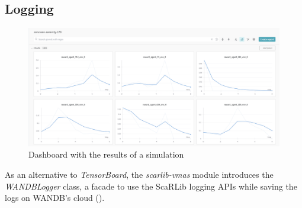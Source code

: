 \documentclass[12pt,a4paper,openright,twoside]{book}
\begin{document}
\subsection{Logging}

\begin{figure}[t]
    \centering
    \includegraphics[width=\textwidth]{img/wandb.png}
    \caption{Dashboard with the results of a simulation}
    \label{fig:wandb}
\end{figure}

As an alternative to \emph{TensorBoard}, the \emph{scarlib-vmas} module introduces the \emph{WANDBLogger} class, a facade to use the ScaRLib logging APIs while saving the logs on WANDB's cloud ().
\end{document}
